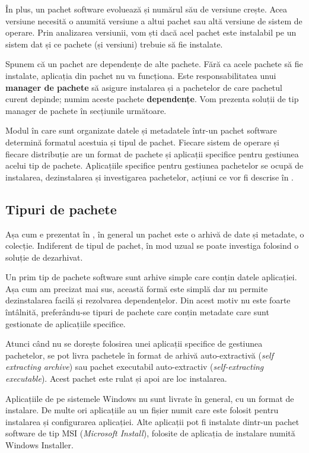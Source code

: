 În plus, un pachet software evoluează și numărul său de versiune crește.
Acea versiune necesită o anumită versiune a altui pachet sau altă versiune de sistem de operare.
Prin analizarea versiunii, vom ști dacă acel pachet este instalabil pe un sistem dat și ce pachete (și versiuni) trebuie să fie instalate.

Spunem că un pachet are dependențe de alte pachete.
Fără ca acele pachete să fie instalate, aplicația din pachet nu va funcționa.
Este responsabilitatea unui \textbf{manager de pachete} să asigure instalarea și a pachetelor de care pachetul curent depinde;
numim aceste pachete \textbf{dependențe}.
Vom prezenta soluții de tip manager de pachete în secțiunile următoare.

Modul în care sunt organizate datele și metadatele într-un pachet software determină formatul acestuia și tipul de pachet.
Fiecare sistem de operare și fiecare distribuție are un format de pachete și aplicații specifice pentru gestiunea acelui tip de pachete.
Aplicațiile specifice pentru gestiunea pachetelor se ocupă de instalarea, dezinstalarea și investigarea pachetelor, acțiuni ce vor fi descrise în .

\subsection{Tipuri de pachete}
\label{sec:package:types}

Așa cum e prezentat în , în general un pachet este o arhivă de date și metadate, o colecție.
Indiferent de tipul de pachet, în mod uzual se poate investiga folosind o soluție de dezarhivat.

Un prim tip de pachete software sunt arhive simple care conțin datele aplicației.
Așa cum am precizat mai sus, această formă este simplă dar nu permite dezinstalarea facilă și rezolvarea dependențelor.
Din acest motiv nu este foarte întâlnită, preferându-se tipuri de pachete care conțin metadate care sunt gestionate de aplicațiile specifice.

Atunci când nu se dorește folosirea unei aplicații specifice de gestiunea pachetelor, se pot livra pachetele în format de arhivă auto-extractivă (\textit{self extracting archive}) sau pachet executabil auto-extractiv (\textit{self-extracting executable}).
Acest pachet este rulat și apoi are loc instalarea.

Aplicațiile de pe sistemele Windows nu sunt livrate în general, cu un format de instalare.
De multe ori aplicațiile au un fișier numit  care este folosit pentru instalarea și configurarea aplicației.
Alte aplicații pot fi instalate dintr-un pachet software de tip MSI  (\textit{Microsoft Install}), folosite de aplicația de instalare numită Windows Installer.

